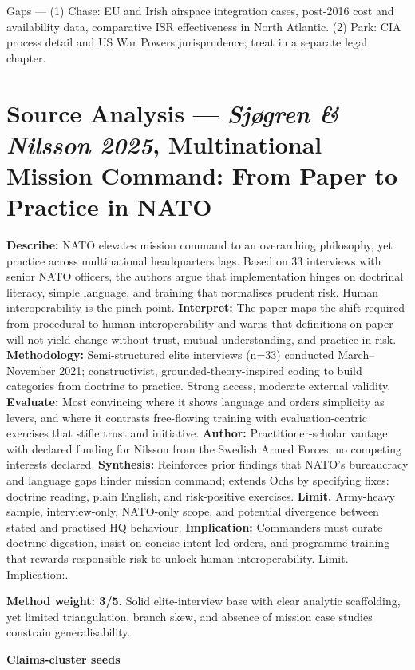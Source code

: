 Gaps — (1) Chase: EU and Irish airspace integration cases, post-2016 cost and availability data, comparative ISR effectiveness in North Atlantic. (2) Park: CIA process detail and US War Powers jurisprudence; treat in a separate legal chapter.

\parencite{SJOGREN_2025}
\section*{Source Analysis — \textit{Sjøgren \& Nilsson 2025}, Multinational Mission Command: From Paper to Practice in NATO}
\textbf{Describe:} NATO elevates mission command to an overarching philosophy, yet practice across multinational headquarters lags. Based on 33 interviews with senior NATO officers, the authors argue that implementation hinges on doctrinal literacy, simple language, and training that normalises prudent risk. Human interoperability is the pinch point.
\textbf{Interpret:} The paper maps the shift required from procedural to human interoperability and warns that definitions on paper will not yield change without trust, mutual understanding, and practice in risk.
\textbf{Methodology:} Semi-structured elite interviews (n=33) conducted March–November 2021; constructivist, grounded-theory-inspired coding to build categories from doctrine to practice. Strong access, moderate external validity.
\textbf{Evaluate:} Most convincing where it shows language and orders simplicity as levers, and where it contrasts free-flowing training with evaluation-centric exercises that stifle trust and initiative.
\textbf{Author:} Practitioner-scholar vantage with declared funding for Nilsson from the Swedish Armed Forces; no competing interests declared.
\textbf{Synthesis:} Reinforces prior findings that NATO’s bureaucracy and language gaps hinder mission command; extends Ochs by specifying fixes: doctrine reading, plain English, and risk-positive exercises.
\textbf{Limit.} Army-heavy sample, interview-only, NATO-only scope, and potential divergence between stated and practised HQ behaviour.
\textbf{Implication:} Commanders must curate doctrine digestion, insist on concise intent-led orders, and programme training that rewards responsible risk to unlock human interoperability. Limit. Implication:.

\textbf{Method weight: 3/5.} Solid elite-interview base with clear analytic scaffolding, yet limited triangulation, branch skew, and absence of mission case studies constrain generalisability.

\textbf{Claims-cluster seeds}

